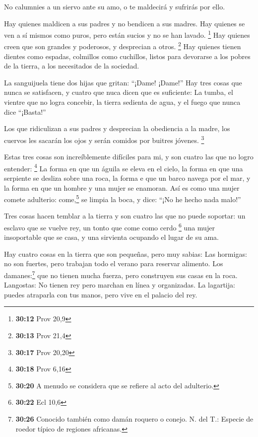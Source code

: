  No calumnies a un siervo ante su amo, o te maldecirá y
sufrirás por ello.

 Hay quienes maldicen a sus padres y no bendicen a sus
madres.  Hay quienes se ven a sí mismos como puros, pero
están sucios y no se han lavado. \footnote{\textbf{30:12} Prov 20,9}
 Hay quienes creen que son grandes y poderosos, y
desprecian a otros. \footnote{\textbf{30:13} Prov 21,4} 
Hay quienes tienen dientes como espadas, colmillos como cuchillos,
listos para devorarse a los pobres de la tierra, a los necesitados de la
sociedad.

 La sanguijuela tiene dos hijas que gritan: ``¡Dame!
¡Dame!'' Hay tres cosas que nunca se satisfacen, y cuatro que nuca dicen
que es suficiente:  La tumba, el vientre que no logra
concebir, la tierra sedienta de agua, y el fuego que nunca dice
``¡Basta!''

 Los que ridiculizan a sus padres y desprecian la
obediencia a la madre, los cuervos les sacarán los ojos y serán comidos
por buitres jóvenes. \footnote{\textbf{30:17} Prov 20,20}

 Estas tres cosas son increíblemente difíciles para mi, y
son cuatro las que no logro entender: \footnote{\textbf{30:18} Prov 6,16}
 La forma en que un águila se eleva en el cielo, la forma
en que una serpiente se desliza sobre una roca, la forma e que un barco
navega por el mar, y la forma en que un hombre y una mujer se enamoran.
 Así es como una mujer comete adulterio: come,\footnote{\textbf{30:20}
  A menudo se considera que se refiere al acto del adulterio.} se limpia
la boca, y dice: ``¡No he hecho nada malo!''

 Tres cosas hacen temblar a la tierra y son cuatro las
que no puede soportar:  un esclavo que se vuelve rey, un
tonto que come como cerdo \footnote{\textbf{30:22} Ecl 10,6}
 una mujer insoportable que se casa, y una sirvienta
ocupando el lugar de su ama.

 Hay cuatro cosas en la tierra que son pequeñas, pero muy
sabias:  Las hormigas: no son fuertes, pero trabajan todo
el verano para reservar alimento.  Los
damanes:\footnote{\textbf{30:26} Conocido también como damán roquero o
  conejo. N. del T.: Especie de roedor típico de regiones africanas.}
que no tienen mucha fuerza, pero construyen sus casas en la roca.
 Langostas: No tienen rey pero marchan en línea y
organizadas.  La lagartija: puedes atraparla con tus
manos, pero vive en el palacio del rey.

